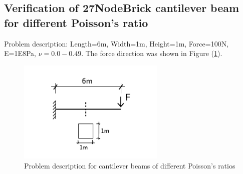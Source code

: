\documentclass[fleqn,11pt]{article}
\begin{document}










\newpage
\subsection{Verification of 27NodeBrick cantilever beam for different Poisson's ratio}




Problem description: Length=6m, Width=1m, Height=1m, Force=100N, E=1E8Pa, $\nu=0.0-0.49$.
The force direction was shown in Figure (\ref{fig Problem description for cantilever beams of different Poisson's 27}). 

\begin{figure}[H]
  \centering
  \includegraphics[width=7cm]{../Figure-files/cantilever_6.pdf}
  \caption{Problem description for cantilever beams of different Poisson's ratios}
  \label{fig Problem description for cantilever beams of different Poisson's 27}
\end{figure}
\end{document}

